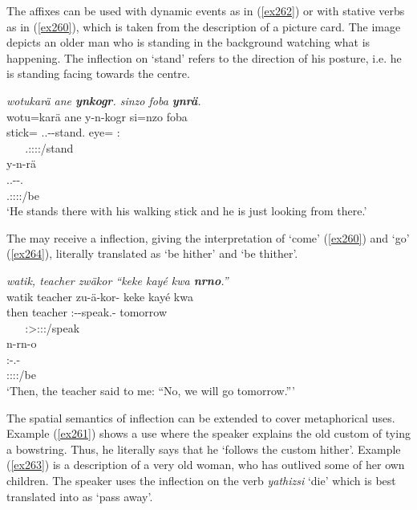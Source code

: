 The  affixes can be used with dynamic events as in (\ref{ex262}) or with stative verbs as in (\ref{ex260}), which is taken from the description of a picture card. The image depicts an older man who is standing in the background watching what is happening. The  inflection on `stand' refers to the direction of his posture, i.e. he is standing facing towards the  centre.

\begin{exe}
	\ex \emph{wotukarä ane \textbf{ynkogr}. sinzo foba \textbf{ynrä}.}\\
	\glll wotu=karä ane y-n-kogr si=nzo foba\\
	stick=\Prop{} \Dem{} \Tsg.\Masc.\Alph-\Venit-stand.\Ndu{} eye=\Only{} \Dist:\Abl{}\\
	~ ~ {\Tsg.\Masc:\Sbj:\Nonpast:\Ipfv:\Venit/stand} ~ ~\\
	\sn
	\glll y-n-rä\\
	\Tsg.\Masc.\Alph-\Venit-\Cop.\Ndu\\
	\footnotesize{\Tsg.\Masc:\Sbj:\Nonpast:\Ipfv:\Venit/be}\\
	\trans `He stands there with his walking stick and he is just looking from there.'\\ 
	\label{ex260}
\end{exe}

The  may receive a  inflection, giving the interpretation of `come' (\ref{ex260}) and `go' (\ref{ex264}), literally translated as `be hither' and `be thither'.

\begin{exe}
	\ex \emph{watik, teacher zwäkor ``keke kayé kwa \textbf{nrno}.''}\\
	\glll watik teacher zu-ä-kor-\Zero{} keke kayé kwa\\
	then teacher \Fsg:\Gam-\Ndu-speak.\Rs-\Stsg{} \Neg{} tomorrow \Fut{}\\
	~ ~ {\Stsg:\Sbj>\Fsg:\Obj:\Rpst:\Pfv/speak} ~ ~ ~\\
	\sn
	\glll n-rn-o\\
	\Fnsg:\Alph-\Cop.\Du-\Andat{}\\
	\footnotesize{\Fdu:\Sbj:\Nonpast:\Ipfv:\Andat/be}\\
	\trans `Then, the teacher said to me: ``No, we will go tomorrow.'''\\ 
	\label{ex264}
\end{exe}

The spatial semantics of  inflection can be extended to cover metaphorical uses. Example (\ref{ex261}) shows a  use where the speaker explains the old custom of tying a bowstring. Thus, he literally says that he `follows the custom hither'. Example (\ref{ex263}) is a description of a very old woman, who has outlived some of her own children. The speaker uses the  inflection on the verb \emph{yathizsi} `die' which is best translated into  as `pass away'.

